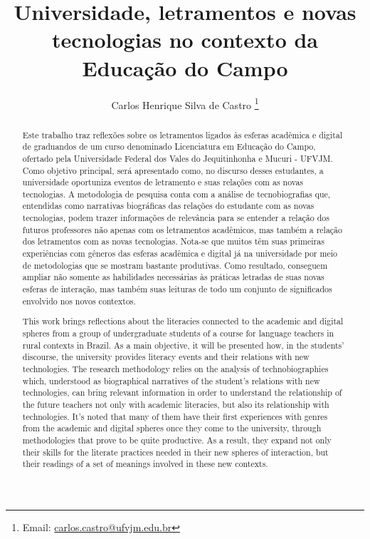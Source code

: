 \documentclass{textolivre}
\title{Universidade, letramentos e novas tecnologias no contexto da Educação do Campo}
\author[1]{Carlos Henrique Silva de Castro \orcid{0000-0001-8593-060X} \thanks{Email: \url{carlos.castro@ufvjm.edu.br}}}
\affil[1]{Universidade Federal dos Vales do Jequitinhonha e Mucuri, Diamantina, MG, Brasil.}
\begin{document}
\maketitle

\begin{polyabstract}
\begin{abstract}
Este trabalho traz reflexões sobre os letramentos ligados às esferas acadêmica e digital de graduandos de um curso denominado Licenciatura em Educação do Campo, ofertado pela Universidade Federal dos Vales do Jequitinhonha e Mucuri - UFVJM. Como objetivo principal, será apresentado como, no discurso desses estudantes, a universidade oportuniza eventos de letramento e suas relações com as novas tecnologias. A metodologia de pesquisa conta com a análise de tecnobiografias que, entendidas como narrativas biográficas das relações do estudante com as novas tecnologias, podem trazer informações de relevância para se entender a relação dos futuros professores não apenas com os letramentos acadêmicos, mas também a relação dos letramentos com as novas tecnologias. Nota-se que muitos têm suas primeiras experiências com gêneros das esferas acadêmica e digital já na universidade por meio de metodologias que se mostram bastante produtivas. Como resultado, conseguem ampliar não somente as habilidades necessárias às práticas letradas de suas novas esferas de interação, mas também suas leituras de todo um conjunto de significados envolvido nos novos contextos.

\end{abstract}

\begin{english}
\begin{abstract}
This work brings reflections about the literacies connected to the academic and digital spheres from a group of undergraduate students of a course for language teachers in rural contexts in Brazil. As a main objective, it will be presented how, in the students' discourse, the university provides literacy events and their relations with new technologies. The research methodology relies on the analysis of technobiographies which, understood as biographical narratives of the student's relations with new technologies, can bring relevant information in order to understand the relationship of the future teachers not only with academic literacies, but also its relationship with technologies. It’s noted that many of them have their first experiences with genres from the academic and digital spheres once they come to the university, through methodologies that prove to be quite productive. As a result, they expand not only their skills for the literate practices needed in their new spheres of interaction, but their readings of a set of meanings involved in these new contexts.


\end{abstract}
\end{english}
\end{polyabstract}
\end{document}
